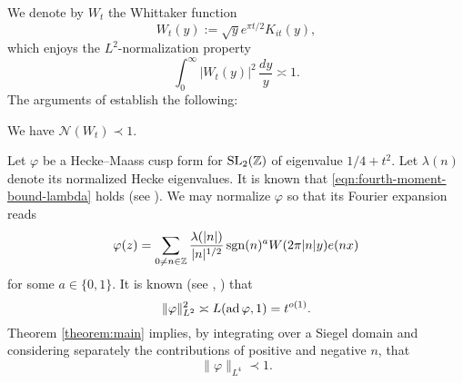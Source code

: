 \documentclass[reqno]{amsart} 
\begin{document}
We denote by $W_t$ the Whittaker function
\begin{equation*}
  W_t(y) := \sqrt{y} e ^{\pi t / 2} K _{i t} (y),
\end{equation*}
which enjoys the $L^2$-normalization property
\begin{equation*}
  \int _0 ^\infty \lvert W_t(y) \rvert ^2 \, \frac{d y}{y} \asymp 1.
\end{equation*}
The arguments of \cite[Theorem 2]{ki20234} establish the following:
\begin{theorem}\label{theorem:main}
  We have $\mathcal{N}(W_t) \prec 1$.
\end{theorem}

\begin{example}
  Let $\varphi$ be a Hecke--Maass cusp form for $\operatorname{SL}_2(\mathbb{Z})$ of eigenvalue $1/4 + t^2$. Let $\lambda(n)$ denote its normalized Hecke eigenvalues.  It is known  that \eqref{eqn:fourth-moment-bound-lambda} holds (see \cite[Lemma 3.6]{MR3102912}).  We may normalize $\varphi$ so that its Fourier expansion reads
  \begin{equation*}
    \varphi(z) = \sum _{0 \neq n \in \mathbb{Z} }
    \frac{\lambda(|n|)}{|n|^{1/2}}
    \operatorname{sgn}(n)^{a} W (2 \pi |n| y) e (n x)
  \end{equation*}
  for some $a \in \{0,1\}$.  It is known (see \cite{MR1067982}, \cite{HL94}) that
  \begin{equation*}
    \lVert \varphi  \rVert ^2 _{L^2} \asymp L(\operatorname{ad} \varphi, 1) = t^{o(1)}.
  \end{equation*}
  Theorem \ref{theorem:main} implies, by integrating over a Siegel domain and considering separately the contributions of positive and negative $n$, that
  \begin{equation*}
    \lVert \varphi  \rVert _{L^4} \prec 1.
  \end{equation*}
\end{example}
\end{document}
